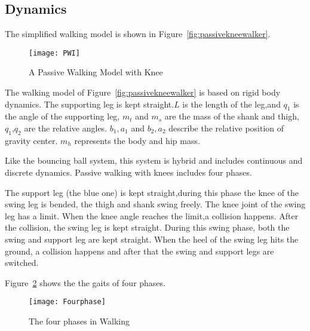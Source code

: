 \subsection*{Dynamics}

The simplified walking model is shown in Figure~\ref{fig:passivekneewalker}.

\begin{figure}[!htbp]
  \begin{center}
    \texttt{[image: PWI]}
    \caption{A Passive Walking Model with Knee}
    \label{fig:}
  \end{center}
\end{figure}
The walking model of Figure~\ref{fig:passivekneewalker} is based on rigid body dynamics.
The supporting leg is kept straight.$L$ is the length of the leg,and $q_1$ is the angle of the supporting leg,
$m_t$ and $m_s$ are the mass of the shank and thigh,
$q_1$,$q_2$ are the relative angles.
$b_1,a_1$ and $b_2,a_2$ describe the relative position of gravity center.
$m_h$ represents the body and hip mass.






Like the bouncing ball system, this system is hybrid\citep{ames2006categorical} and includes continuous and discrete dynamics.
Passive walking with knees includes four phases\citep{Chen2007}.
\begin{itemize}
The support leg (the blue one) is kept straight,during this phase the knee of the swing leg is bended, the thigh and shank swing freely.
The knee joint of the swing leg has a limit.
When the knee angle reaches the limit,a collision happens.
After the collision, the swing leg is kept straight.
During this swing phase, both the swing and support leg are kept straight.
When the heel of the swing leg hits the ground, a collision happens and after that the swing and support legs are switched.
\end{itemize}

Figure~\ref{fig:fwalkingphase} shows the the gaits of four phases.
\begin{figure}[!htbp]
  \begin{center}
      \texttt{[image: Fourphase]}
    \caption{The four phases in Walking}
    \label{fig:fwalkingphase}
\end{center}
\end{figure}





